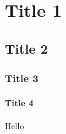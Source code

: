 \documentclass[11pt,a4paper,twoside,onecolumn]{report}
\begin{document}


\tableofcontents


\chapter{Title 1}
\section{Title 2}
\subsection{Title 3}
\subsubsection{Title 4}
Hello
\end{document}

